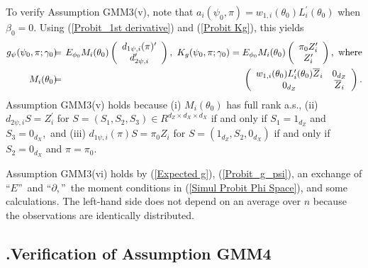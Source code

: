 \documentclass[12pt,titlepage,final,oneside,letterpaper]{article}
\begin{document}
To verify Assumption GMM3(v), note that $a_{i}(\psi _{0},\pi
)=w_{1,i}(\theta _{0})L_{i}^{\prime }(\theta _{0})$ when $\beta _{0}=0.$
Using (\ref{Probit_1st derivative}) and (\ref{Probit Kg}), this yields%
\begin{eqnarray}
g_{\psi }(\psi _{0},\pi ;\gamma _{0})\hspace{-0.08in} &=&\hspace{-0.08in}%
E_{\phi _{0}}M_{i}(\theta _{0})\left( 
\begin{array}{c}
d_{1\psi ,i}(\pi )^{\prime } \\ 
d_{2\psi ,i}^{\prime }%
\end{array}%
\right) ,\text{ }K_{g}(\psi _{0},\pi ;\gamma _{0})=E_{\phi _{0}}M_{i}(\theta
_{0})\left( 
\begin{array}{c}
\pi _{0}Z_{i}^{\prime } \\ 
Z_{i}^{\prime }%
\end{array}%
\right) ,\text{ where}  \notag \\
M_{i}(\theta _{0})\hspace{-0.08in} &=&\hspace{-0.08in}\left( 
\begin{array}{cc}
w_{1,i}(\theta _{0})L_{i}^{\prime }(\theta _{0})\overline{Z}_{i} & 0_{d_{Z}}
\\ 
0_{d_{Z}} & \overline{Z}_{i}%
\end{array}%
\right) .  \label{Probit_g_psi}
\end{eqnarray}%
Assumption GMM3(v) holds because (i) $M_{i}(\theta _{0})$ has full rank
a.s., (ii) $d_{2\psi ,i}S=Z_{i}^{\prime }$ for $S=(S_{1},S_{2},S_{3})\in
R^{d_{Z}\times d_{X}\times d_{X}}$ if and only if $S_{1}=1_{d_{Z}}$ and $%
S_{3}=0_{d_{X}},$ and (iii) $d_{1\psi ,i}(\pi )S=\pi _{0}Z_{i}$ for $%
S=(1_{d_{Z}},S_{2},0_{d_{X}})$ if and only if $S_{2}=0_{d_{X}}$ and $\pi
=\pi _{0}.$

Assumption GMM3(vi) holds by (\ref{Expected g}), (\ref{Probit_g_psi}), an
exchange of \textquotedblleft $E$\textquotedblright\ and \textquotedblleft $%
\partial ,$\textquotedblright\ the moment conditions in (\ref{Simul Probit
Phi Space}), and some calculations. The left-hand side does not depend on an
average over $n$ because the observations are identically distributed.

\subsection{\hspace{-0.23in}\textbf{.}\hspace{0.18in}Verification of
Assumption GMM4}
\end{document}
